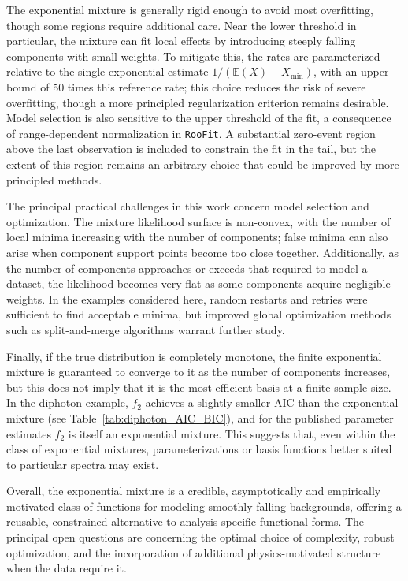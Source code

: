 \documentclass[a4paper,11pt]{article}
\begin{document}
The exponential mixture is generally rigid enough to avoid most overfitting, though some 
regions require additional care. Near the lower threshold in particular, the mixture can fit 
local effects by introducing steeply falling components with small weights.
To mitigate this, the rates are parameterized relative to the single-exponential estimate 
$1/(\mathbb{E}(X)-X_{\min})$, with an upper bound of 50 times this reference rate; this choice 
reduces the risk of severe overfitting, though a more principled regularization criterion 
remains desirable.
Model selection is also sensitive to the upper threshold of the fit, a consequence of 
range-dependent normalization in \texttt{RooFit}. A substantial zero-event region above the 
last observation is included to constrain the fit in the tail, but the extent of this region 
remains an arbitrary choice that could be improved by more principled methods.

The principal practical challenges in this work concern model selection and optimization. 
The mixture likelihood surface is non-convex, with the number of local minima increasing with 
the number of components; false minima can also arise when component support points become too 
close together.
Additionally, as the number of components approaches or exceeds that required to model a 
dataset, the likelihood becomes very flat as some components acquire negligible weights. 
In the examples considered here, random restarts and retries were sufficient to find acceptable 
minima, but improved global optimization methods such as split-and-merge 
algorithms \cite{split-and-merge} warrant further study.

Finally, if the true distribution is completely monotone, the finite exponential mixture is guaranteed 
to converge to it as the number of components increases, but this does not imply that it is the most 
efficient basis at a finite sample size.
In the diphoton example, $f_2$ achieves a slightly smaller AIC than the exponential mixture 
(see Table~\ref{tab:diphoton_AIC_BIC}), and for the published parameter estimates $f_2$ is 
itself an exponential mixture.
This suggests that, even within the class of exponential mixtures, parameterizations or basis functions better suited to particular spectra may exist.

Overall, the exponential mixture is a credible, asymptotically and empirically motivated class of functions for modeling smoothly falling backgrounds, offering a reusable, constrained alternative to 
analysis-specific functional forms.
The principal open questions are concerning the optimal choice of complexity, robust optimization, and the incorporation of additional physics-motivated structure when the data require it.
\end{document}
